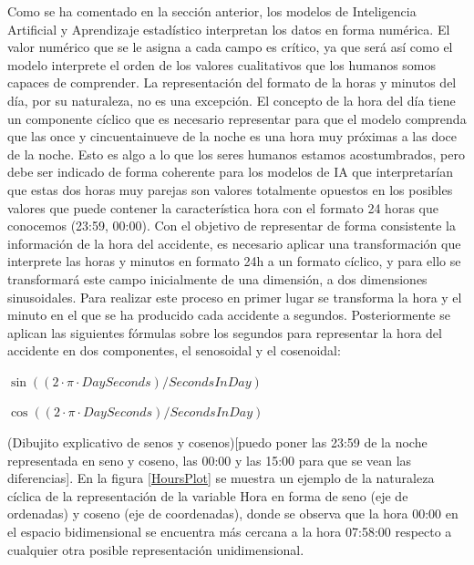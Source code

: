 \documentclass{uathesis-es}
\begin{document}
{	Como se ha comentado en la sección anterior, los modelos de Inteligencia Artificial y Aprendizaje estadístico interpretan los datos en forma numérica. El valor numérico que se le asigna a cada campo es crítico, ya que será así como el modelo interprete el orden de los valores cualitativos que los humanos somos capaces de comprender. La representación del formato de la horas y minutos del día, por su naturaleza, no es una excepción. El concepto de la hora del día tiene un componente cíclico que es necesario representar para que el modelo comprenda que las once y cincuentainueve de la noche es una hora muy próximas a las doce de la noche. Esto es algo a lo que los seres humanos estamos acostumbrados, pero debe ser indicado de forma coherente para los modelos de IA que interpretarían que estas dos horas muy parejas son valores totalmente opuestos en los posibles valores que puede contener la característica hora con el formato 24 horas que conocemos (23:59, 00:00). Con el objetivo de representar de forma consistente la información de la hora del accidente, es necesario aplicar una transformación que interprete las horas y minutos en formato 24h a un formato cíclico, y para ello se transformará este campo inicialmente de una dimensión, a dos dimensiones sinusoidales. Para realizar este proceso en primer lugar se transforma la hora y el minuto en el que se ha producido cada accidente a segundos. Posteriormente se aplican las siguientes fórmulas sobre los segundos para representar la hora del accidente en dos componentes, el senosoidal y el cosenoidal:
	
	
	\begin{center}
		$\sin((2 \cdot \pi \cdot DaySeconds)/SecondsInDay)$
		
		$\cos((2 \cdot \pi \cdot DaySeconds)/SecondsInDay)$
	\end{center}
	
	(Dibujito explicativo de senos y cosenos)[puedo poner las 23:59 de la noche representada en seno y coseno, las 00:00 y las 15:00 para que se vean las diferencias]. En la figura \ref{HoursPlot} se muestra un ejemplo de la naturaleza cíclica de la representación de la variable Hora en forma de seno (eje de ordenadas) y coseno (eje de coordenadas), donde se observa que la hora 00:00 en el espacio bidimensional se encuentra más cercana a la hora 07:58:00 respecto a cualquier otra posible representación unidimensional.
	
}
\end{document}
